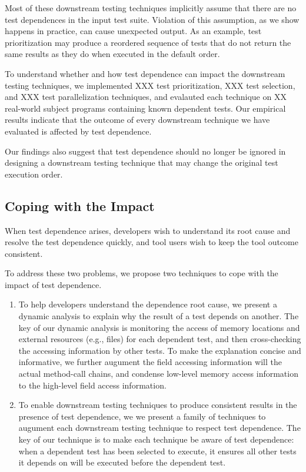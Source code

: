 Most of these downstream testing techniques implicitly
assume that there are no test dependences in the input test
suite. Violation of this assumption, as we show happens in
practice, can cause unexpected output. As an example, test
prioritization may produce a reordered sequence of tests that
do not return the same results as they do when executed in
the default order.

To understand whether and how test dependence can impact
the downstream testing techniques, we implemented XXX
test prioritization, XXX test selection, and XXX test parallelization
techniques, and evalauted each technique
on XX real-world subject programs containing known dependent tests.
Our empirical results indicate that the outcome of
every downstream technique we have evaluated is affected by 
test dependence. 

Our findings also suggest that test dependence should no longer
be ignored in designing a downstream testing technique that
may change the original test execution order.




\subsection{Coping with the Impact}

When test dependence arises, developers wish to understand
its root cause and resolve the test dependence quickly, and
tool users wish to keep the tool outcome consistent.

To address these two problems, we propose two techniques to
cope with the impact of test dependence.

\begin{enumerate}
\item To help developers understand the dependence root cause,
we present a dynamic analysis to explain why the result of
a test depends on another. The key of our dynamic analysis
is monitoring the access of memory locations and external
resources (e.g., files) for each dependent test, and then
cross-checking the accessing information by other tests.
To make the explanation concise and informative, we further
augument the field accessing information will the actual
method-call chains, and condense low-level memory access
information to the high-level field access information.

\item To enable downstream testing techniques to produce
consistent results in the presence of test dependence, we
we present a family of techniques to augument each downstream
testing technique to respect test dependence. The key of
our technique is to make each technique be aware of test dependence:
when a dependent test has been selected to execute, it ensures
all other tests it depends on will be executed before the
dependent test.

\end{enumerate}


